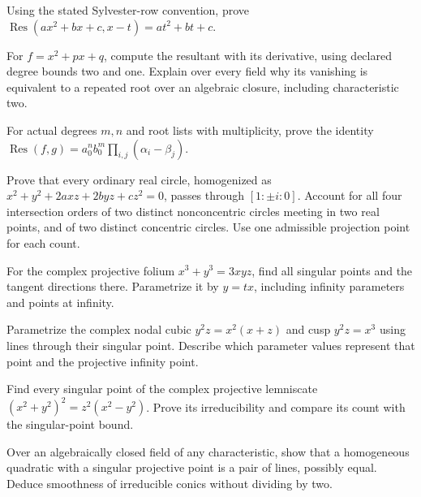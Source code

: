 \begin{exercise}[$\star$]\label{geometry:ex:reslinear}
Using the stated Sylvester-row convention, prove $\operatorname{Res}(ax^2+bx+c,x-t)=at^2+bt+c$.
\end{exercise}
\begin{exercise}[$\star$]\label{geometry:ex:discriminant}
For $f=x^2+px+q$, compute the resultant with its derivative, using declared degree bounds two and one. Explain over every field why its vanishing is equivalent to a repeated root over an algebraic closure, including characteristic two.
\end{exercise}
\begin{exercise}[$\star\star$]\label{geometry:ex:resproduct}
For actual degrees $m,n$ and root lists with multiplicity, prove the identity
$\operatorname{Res}(f,g)=a_0^nb_0^m\prod_{i,j}(\alpha_i-\beta_j)$.
\end{exercise}
\begin{exercise}[$\star\star$]\label{geometry:ex:circularpoints}
Prove that every ordinary real circle, homogenized as $x^2+y^2+2axz+2byz+cz^2=0$, passes through $[1:\pm i:0]$. Account for all four intersection orders of two distinct nonconcentric circles meeting in two real points, and of two distinct concentric circles. Use one admissible projection point for each count.
\end{exercise}
\begin{exercise}[$\star$]\label{geometry:ex:folium}
For the complex projective folium $x^3+y^3=3xyz$, find all singular points and the tangent directions there. Parametrize it by $y=tx$, including infinity parameters and points at infinity.
\end{exercise}
\begin{exercise}[$\star$]\label{geometry:ex:nodalparam}
Parametrize the complex nodal cubic $y^2z=x^2(x+z)$ and cusp $y^2z=x^3$ using lines through their singular point. Describe which parameter values represent that point and the projective infinity point.
\end{exercise}
\begin{exercise}[$\star\star$]\label{geometry:ex:lemniscate}
Find every singular point of the complex projective lemniscate $(x^2+y^2)^2=z^2(x^2-y^2)$. Prove its irreducibility and compare its count with the singular-point bound.
\end{exercise}
\begin{exercise}[$\star$]\label{geometry:ex:irreducibleconic}
Over an algebraically closed field of any characteristic, show that a homogeneous quadratic with a singular projective point is a pair of lines, possibly equal. Deduce smoothness of irreducible conics without dividing by two.
\end{exercise}

